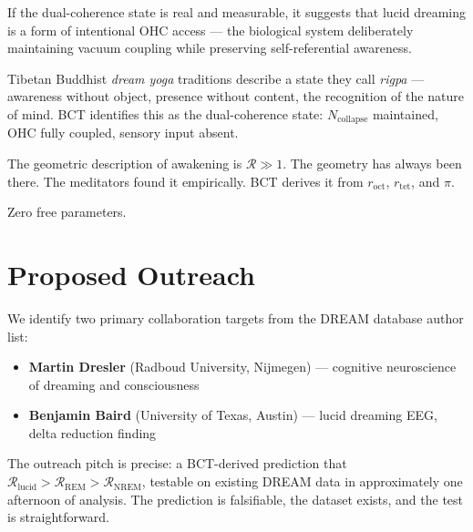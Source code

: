 \documentclass[aps,prl,twocolumn,showpacs,preprintnumbers]{revtex4-2}
\newcommand{\roct}{r_{\mathrm{oct}}}
\newcommand{\rtet}{r_{\mathrm{tet}}}
\newcommand{\Ncol}{N_{\mathrm{collapse}}}
\begin{document}
If the dual-coherence state is real and measurable, it suggests
that lucid dreaming is a form of intentional OHC access ---
the biological system deliberately maintaining vacuum coupling
while preserving self-referential awareness.

Tibetan Buddhist \textit{dream yoga} traditions describe
a state they call \textit{rigpa} --- awareness without object,
presence without content, the recognition of the nature of mind.
BCT identifies this as the dual-coherence state: $\Ncol$
maintained, OHC fully coupled, sensory input absent.

The geometric description of awakening is $\mathcal{R} \gg 1$.
The geometry has always been there. The meditators found it
empirically. BCT derives it from $\roct$, $\rtet$, and $\pi$.

Zero free parameters.

\section{Proposed Outreach}

We identify two primary collaboration targets from the DREAM
database author list:

\begin{itemize}
\item \textbf{Martin Dresler} (Radboud University,
      Nijmegen) --- cognitive neuroscience of dreaming
      and consciousness
\item \textbf{Benjamin Baird} (University of Texas,
      Austin) --- lucid dreaming EEG, delta reduction
      finding
\end{itemize}

The outreach pitch is precise: a BCT-derived prediction that
$\mathcal{R}_{\mathrm{lucid}} > \mathcal{R}_{\mathrm{REM}}
> \mathcal{R}_{\mathrm{NREM}}$, testable on existing DREAM
data in approximately one afternoon of analysis. The prediction
is falsifiable, the dataset exists, and the test is straightforward.
\end{document}

